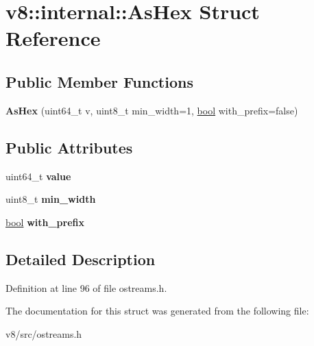 \hypertarget{structv8_1_1internal_1_1AsHex}{}\section{v8\+:\+:internal\+:\+:As\+Hex Struct Reference}
\label{structv8_1_1internal_1_1AsHex}
\subsection*{Public Member Functions}
\begin{DoxyCompactItemize}
\item 
\mbox{\label{structv8_1_1internal_1_1AsHex_a1bd7d9e72e0681dc598f987863f799da}} 
{\bfseries As\+Hex} (uint64\+\_\+t v, uint8\+\_\+t min\+\_\+width=1, \mbox{\hyperlink{classbool}{bool}} with\+\_\+prefix=false)
\end{DoxyCompactItemize}
\subsection*{Public Attributes}
\begin{DoxyCompactItemize}
\item 
\mbox{\label{structv8_1_1internal_1_1AsHex_affb6ddcab204b8b3a403083eca669a9e}} 
uint64\+\_\+t {\bfseries value}
\item 
\mbox{\label{structv8_1_1internal_1_1AsHex_a50cb3bdb7ed098115b25b0afa522751a}} 
uint8\+\_\+t {\bfseries min\+\_\+width}
\item 
\mbox{\label{structv8_1_1internal_1_1AsHex_a723aba799eb0a20091c988929b7b4acf}} 
\mbox{\hyperlink{classbool}{bool}} {\bfseries with\+\_\+prefix}
\end{DoxyCompactItemize}


\subsection{Detailed Description}


Definition at line 96 of file ostreams.\+h.



The documentation for this struct was generated from the following file\+:\begin{DoxyCompactItemize}
\item 
v8/src/ostreams.\+h\end{DoxyCompactItemize}
